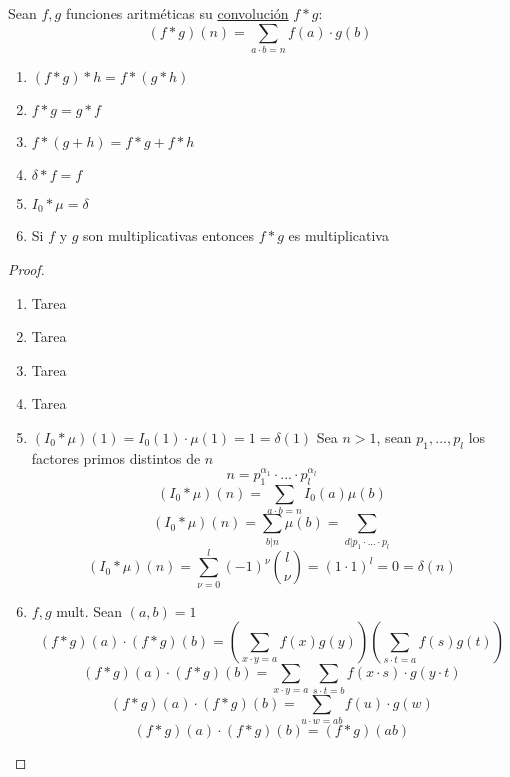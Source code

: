 \begin{defn}[Convolución]
	Sean $f,g$ funciones aritméticas su \underline{convolución} $f*g$:
	\[(f*g)(n)=\sum_{a\cdot b=n}f(a)\cdot g(b)\]
\end{defn}
\begin{thm}
	\begin{enumerate}[label=(\alph*)]
		\item $(f*g)*h=f*(g*h)$

		\item $f*g=g*f$

		\item $f*(g+h)=f*g+f*h$

		\item $\delta*f=f$

		\item $I_0*\mu=\delta$

		\item Si $f$ y $g$ son multiplicativas entonces $f*g$ es multiplicativa
	\end{enumerate}
\end{thm}
\begin{proof}
	\
	\begin{enumerate}[label=(\alph*)]
		\item Tarea

		\item Tarea

		\item Tarea

		\item Tarea

		\item $(I_0*\mu)(1)=I_0(1)\cdot\mu(1)=1=\delta(1)$
		      Sea $n>1$, sean $p_1,...,p_l$ los factores primos distintos de $n$
		      \[n=p_1^{\alpha_1}\cdot...\cdot p_l^{\alpha_l}\]
		      \[(I_0*\mu)(n)=\sum_{a\cdot b=n}I_0(a)\mu(b)\]
		      \[(I_0*\mu)(n)=\sum_{b|n}\mu(b)=\sum_{d|p_1\cdot...\cdot p_l}\]
		      \[(I_0*\mu)(n)=\sum_{\nu=0}^l(-1)^\nu\binom{l}{\nu}=(1\cdot 1)^l=0=\delta(n)\]

		\item $f,g$ mult. Sean $(a,b)=1$
		      \[(f*g)(a)\cdot(f*g)(b)=\left(\sum_{x\cdot y=a}f(x)g(y)\right)\left(\sum_{s\cdot t=a}f(s)g(t)\right)\]
		      \[(f*g)(a)\cdot(f*g)(b)=\sum_{x\cdot y=a}\sum_{s\cdot t=b}f(x\cdot s)\cdot g(y\cdot t)\]
		      \[(f*g)(a)\cdot(f*g)(b)=\sum_{u\cdot w=ab}f(u)\cdot g(w)\]
		      \[(f*g)(a)\cdot(f*g)(b)=(f*g)(ab)\]
	\end{enumerate}
\end{proof}
